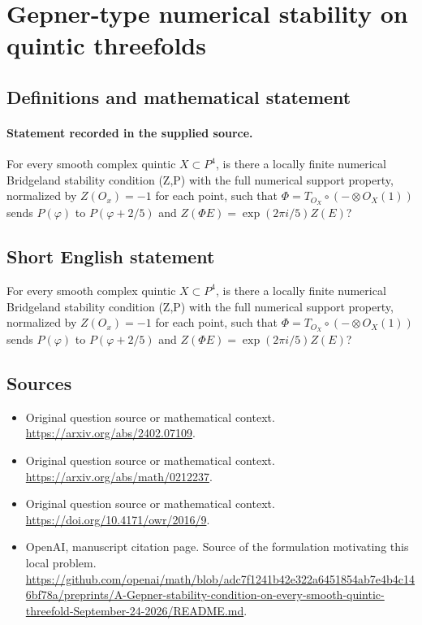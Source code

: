 \documentclass[11pt]{article}
\begin{document}
\section*{Gepner-type numerical stability on quintic threefolds}\label{statement}
\subsection{Definitions and mathematical statement}
\paragraph{Statement recorded in the supplied source.}
For every smooth complex quintic $X\subset P^{4}$, is there a locally finite numerical Bridgeland stability condition (Z,P) with the full numerical support property, normalized by $Z(O_x)=-1$ for each point, such that $\Phi =T_{O_X}\circ (-\otimes O_X(1))$ sends $P(\varphi )$ to $P(\varphi +2/5)$ and $Z(\Phi E)=\exp (2\pi i/5)Z(E)$?
\subsection{Short English statement}
For every smooth complex quintic $X\subset P^{4}$, is there a locally finite numerical Bridgeland stability condition (Z,P) with the full numerical support property, normalized by $Z(O_x)=-1$ for each point, such that $\Phi =T_{O_X}\circ (-\otimes O_X(1))$ sends $P(\varphi )$ to $P(\varphi +2/5)$ and $Z(\Phi E)=\exp (2\pi i/5)Z(E)$?
\subsection{Sources}
\begin{itemize}
\item[S1] Original question source or mathematical context.
\url{https://arxiv.org/abs/2402.07109}.
\item[S2] Original question source or mathematical context.
\url{https://arxiv.org/abs/math/0212237}.
\item[S3] Original question source or mathematical context.
\url{https://doi.org/10.4171/owr/2016/9}.
\item[S4] OpenAI, manuscript citation page. Source of the formulation motivating this local problem.
\url{https://github.com/openai/math/blob/adc7f1241b42e322a6451854ab7e4b4c146bf78a/preprints/A-Gepner-stability-condition-on-every-smooth-quintic-threefold-September-24-2026/README.md}.
\end{itemize}
\end{document}
